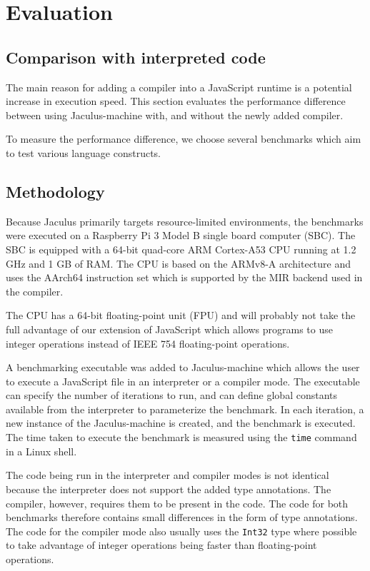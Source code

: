 \chapter{Evaluation}

\section{Comparison with interpreted code}

The main reason for adding a compiler into a JavaScript runtime is a potential increase in execution speed. This section evaluates the performance difference between using Jaculus-machine with, and without the newly added compiler.

To measure the performance difference, we choose several benchmarks which aim to test various language constructs.

\section{Methodology}

Because Jaculus primarily targets resource-limited environments, the benchmarks were executed on a Raspberry Pi 3 Model B\cite{rpi3b_product} single board computer (SBC). The SBC is equipped with a 64-bit quad-core ARM Cortex-A53 CPU running at 1.2 GHz and 1 GB of RAM. The CPU is based on the ARMv8-A architecture and uses the AArch64 instruction set which is supported by the MIR backend used in the compiler.

The CPU has a 64-bit floating-point unit (FPU) and will probably not take the full advantage of our extension of JavaScript which allows programs to use integer operations instead of IEEE 754 floating-point operations.

A benchmarking executable was added to Jaculus-machine which allows the user to execute a JavaScript file in an interpreter or a compiler mode. The executable can specify the number of iterations to run, and can define global constants available from the interpreter to parameterize the benchmark. In each iteration, a new instance of the Jaculus-machine is created, and the benchmark is executed. The time taken to execute the benchmark is measured using the \texttt{time} command in a Linux shell.

The code being run in the interpreter and compiler modes is not identical because the interpreter does not support the added type annotations. The compiler, however, requires them to be present in the code. The code for both benchmarks therefore contains small differences in the form of type annotations. The code for the compiler mode also usually uses the \texttt{Int32} type where possible to take advantage of integer operations being faster than floating-point operations.

